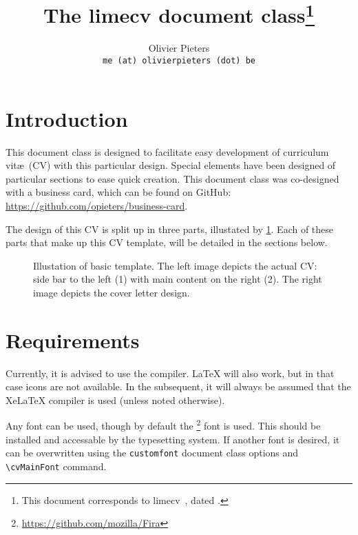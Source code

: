 \documentclass{article}
\title{The \textsf{limecv} document class\thanks{This document corresponds to \textsf{limecv}~\fileversion, dated \filedate.}}
\author{Olivier Pieters \\ \texttt{me (at) olivierpieters (dot) be}}
\begin{document}
\maketitle

\section{Introduction}

This document class is designed to facilitate easy development of curriculum vit\ae\ (CV) with this particular design. Special elements have been designed of particular sections to ease quick creation. This document class was co-designed with a business card, which can be found on GitHub: \url{https://github.com/opieters/business-card}.

The design of this CV is split up in three parts, illustated by \cref{design}. Each of these parts that make up this CV template, will be detailed in the sections below.

\begin{figure}[!ht]
  \centering
  \hspace{2cm}%
  \caption{Illustation of basic template. The left image depicts the actual CV: side bar to the left (1) with main content on the right (2). The right image depicts the cover letter design.}
  \label{design}
\end{figure}

\section{Requirements}

  Currently, it is advised to use the  compiler. LaTeX will also work, but in that case icons are not available. In the subsequent, it will always be assumed that the XeLaTeX compiler is used (unless noted otherwise). 

  Any font can be used, though by default the \footnote{\url{https://github.com/mozilla/Fira}} font is used. This should be installed and accessable by the typesetting system. If another font is desired, it can be overwritten using the \lstinline|customfont| document class options and \lstinline|\cvMainFont| command. 
\end{document}
